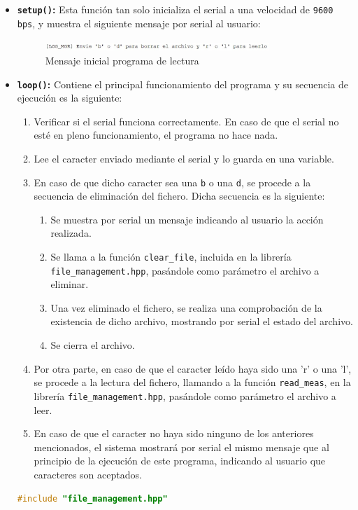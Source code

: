 \begin{itemize}
    \item \textbf{\texttt{setup()}:} Esta función tan solo inicializa el serial a una velocidad de \texttt{9600 bps}, y muestra el siguiente mensaje por serial al usuario:
    \begin{figure}[H]
        \centering
        \includegraphics[width=0.8\textwidth]{images/3-software/3-4-readfile/MensajeInicial.png}
        \caption{Mensaje inicial programa de lectura}
        \label{fig:3-4-1-MensajeInicial}
    \end{figure}
    \item \textbf{\texttt{loop()}:} Contiene el principal funcionamiento del programa y su secuencia de ejecución es la siguiente:
    \begin{enumerate}
        \item Verificar si el serial funciona correctamente. En caso de que el serial no esté en pleno funcionamiento, el programa no hace nada.
        \item Lee el caracter enviado mediante el serial y lo guarda en una variable.
        \item En caso de que dicho caracter sea una \texttt{b} o una \texttt{d}, se procede a la secuencia de eliminación del fichero. Dicha secuencia es la siguiente:
        \begin{enumerate}
            \item Se muestra por serial un mensaje indicando al usuario la acción realizada.
            \item Se llama a la función \texttt{clear\_file}, incluida en la librería \texttt{file\_management.hpp}, pasándole como parámetro el archivo a eliminar.
            \item Una vez eliminado el fichero, se realiza una comprobación de la existencia de dicho archivo, mostrando por serial el estado del archivo.
            \item Se cierra el archivo.
        \end{enumerate}
        \item Por otra parte, en caso de que el caracter leído haya sido una 'r' o una 'l', se procede a la lectura del fichero, llamando a la función \texttt{read\_meas}, en la librería \texttt{file\_management.hpp}, pasándole como parámetro el archivo a leer.
        \item En caso de que el caracter no haya sido ninguno de los anteriores mencionados, el sistema mostrará por serial el mismo mensaje que al principio de la ejecución de este programa, indicando al usuario que caracteres son aceptados.
    \end{enumerate}
    \begin{lstlisting}[captionpos=b, caption={Programa lectura o eliminación de fichero}, language=c++]
        #include "file_management.hpp"


\end{lstlisting}
\end{itemize}
